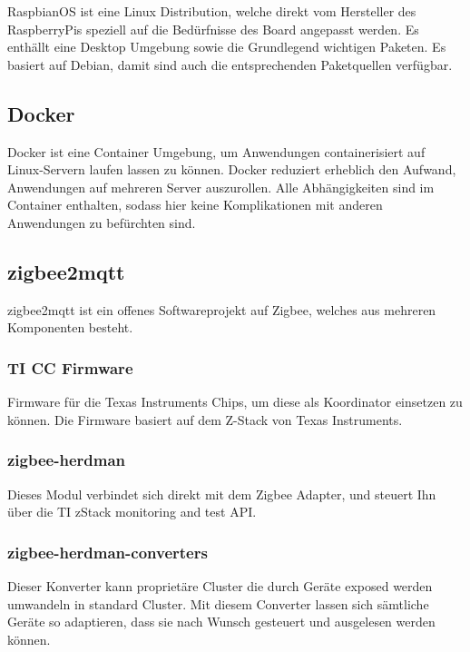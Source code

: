 RaspbianOS ist eine Linux Distribution, welche direkt vom Hersteller des RaspberryPis speziell auf die Bedürfnisse des Board angepasst werden. Es enthällt eine
Desktop Umgebung sowie die Grundlegend wichtigen Paketen. Es basiert auf Debian, damit sind auch die entsprechenden Paketquellen verfügbar.

\subsection{Docker}

Docker ist eine Container Umgebung, um Anwendungen containerisiert auf Linux-Servern laufen lassen zu können. Docker reduziert erheblich den Aufwand, 
Anwendungen auf mehreren Server auszurollen. Alle Abhängigkeiten sind im Container enthalten, sodass hier keine Komplikationen mit anderen Anwendungen
zu befürchten sind.

\subsection{zigbee2mqtt}

zigbee2mqtt ist ein offenes Softwareprojekt auf Zigbee, welches aus mehreren Komponenten besteht.

\subsubsection{TI CC Firmware}

Firmware für die Texas Instruments Chips, um diese als Koordinator einsetzen zu können. Die Firmware basiert auf dem Z-Stack von Texas Instruments.

\subsubsection{zigbee-herdman}

Dieses Modul verbindet sich direkt mit dem Zigbee Adapter, und steuert Ihn über die TI zStack monitoring and test API. \cite{zstack}

\subsubsection{zigbee-herdman-converters}

Dieser Konverter kann proprietäre Cluster die durch Geräte exposed werden umwandeln in standard Cluster. Mit diesem Converter lassen sich sämtliche Geräte
so adaptieren, dass sie nach Wunsch gesteuert und ausgelesen werden können.

